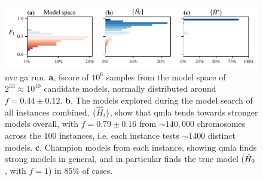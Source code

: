 \begin{figure}
    \begin{center}
        \includegraphics{experimental_study/figures/nv_ga_run_models_by_f.pdf}
    \end{center}
    \caption[Nitrogen-vacancy centre genetic algorithm run]{
        \Acrlong{nvc} \acrlong{ga} \gls{run}.
        \textbf{a}, 
            \gls{fscore} of $10^6$ samples from the \gls{model space} of $2^{33}\approx10^{10}$ candidate models,
            normally distributed around $f=0.44 \pm 0.12$. 
        \textbf{b}, The models explored during the model search of all \glspl{instance} combined, 
            $\{\hat{H}_i\}$, show that \gls{qmla} tends towards stronger models overall, 
            with $f = 0.79 \pm 0.16$ from $\sim 140,000$ chromosomes across the 100 instances, 
            i.e. each \gls{instance} tests $\sim 1400$ distinct models. 
        \textbf{c}, Champion models from each instance, showing \gls{qmla} finds strong models 
            in general, and in particular finds the \gls{true model} ($\hat{H}_0$, with $f=1$) in $85\%$ of cases.
        }
    \label{fig:nv_ga_run_models}
\end{figure}

